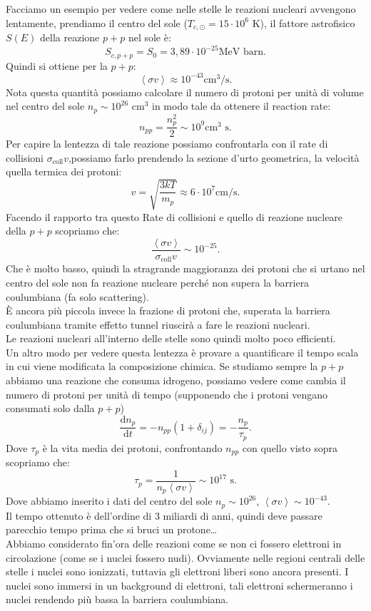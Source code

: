 Facciamo un esempio per vedere come nelle stelle le reazioni nucleari avvengono lentamente, prendiamo il centro del sole ($T_{c,\odot}=15\cdot 10^6$ K), il fattore astrofisico $S(E)$ della reazione $p+p$ nel sole è:
\[
S_{c,p+p}=S_0=3,89\cdot 10^{-25} \text{MeV}\text{ barn}
.\] 
Quindi si ottiene per la $p+p$:
\[
\left<\sigma v\right>\approx 10^{-43} \text{cm}^3 /\text{s}
.\] 
Nota questa quantità possiamo calcolare il numero di protoni per unità di volume nel centro del sole $n_p \sim 10^{26}$ cm$^3$ in modo tale da ottenere il reaction rate:
\[
n_{pp} = \frac{n_p^2
}{2}\sim 10^9 \text{cm}^3\text{ s}
.\] 
Per capire la lentezza di tale reazione possiamo confrontarla con il rate di collisioni $\sigma_\text{coll} v$,possiamo farlo prendendo la sezione d'urto geometrica, la velocità quella termica dei protoni:
\[
v = \sqrt{\frac{3kT}{m_p}}\approx 6\cdot 10^7 \text{cm}/\text{s}
.\] 
Facendo il rapporto tra questo Rate di collisioni e quello di reazione nucleare della $p+p$ scopriamo che:
\[
\frac{\left<\sigma v\right>}{\sigma_\text{coll} v} \sim 10^{-25}
.\] 
Che è molto basso, quindi la stragrande maggioranza dei protoni che si urtano nel centro del sole non fa reazione nucleare perché non supera la barriera coulumbiana (fa solo scattering). \\
È ancora più piccola invece la frazione di protoni che, superata la barriera coulumbiana tramite effetto tunnel riuscirà a fare le reazioni nucleari. \\
Le reazioni nucleari all'interno delle stelle sono quindi molto poco efficienti.\\
Un altro modo per vedere questa lentezza è provare a quantificare il tempo scala in cui viene modificata la composizione chimica. Se studiamo sempre la $p+p$ abbiamo una reazione che consuma idrogeno, possiamo vedere come cambia il numero di protoni per unità di tempo (supponendo che i protoni vengano consumati solo dalla $p+p$)
\[
    \frac{\text{d} n_p}{\text{d} t} = -n_{pp}\left(1+\delta_{ij}\right) =
    -\frac{n_p}{\tau_p}
.\] 
Dove $\tau_p$  è la vita media dei protoni, confrontando $n_{pp}$  con quello visto sopra scopriamo che:
\[
\tau_p = \frac{1}{n_p\left<\sigma v\right>} \sim 10^{17} \text{ s}
.\] 
Dove abbiamo inserito i dati del centro del sole $n_p \sim 10^{26}$, $\left<\sigma v\right>\sim 10^{-43}$. \\
Il tempo ottenuto è dell'ordine di 3 miliardi di anni, quindi deve passare parecchio tempo prima che si bruci un protone\ldots\\
Abbiamo considerato fin'ora delle reazioni come se non ci fossero elettroni in circolazione (come se i nuclei fossero nudi). Ovviamente nelle regioni centrali delle stelle i nuclei sono ionizzati, tuttavia gli elettroni liberi sono ancora presenti. I nuclei sono immersi in un background di elettroni, tali elettroni schermeranno i nuclei rendendo più bassa la barriera coulumbiana.\\
